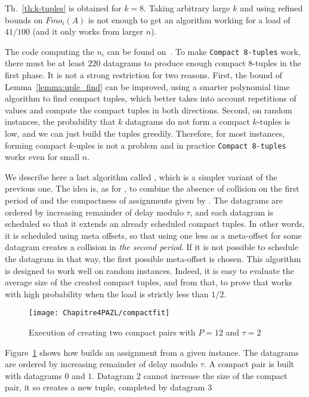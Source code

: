 Th.~\ref{th:k-tuples} is obtained for $k=8$. Taking arbitrary large $k$ and using refined bounds on $Fmo_i(A)$ is not enough to get an algorithm working for a load of $41/100$ (and it only works from larger $n$).

The code computing the $n_i$ can be found on~\cite{webpage}.
To make \texttt{Compact 8-tuples} work, there must be at least $220$ datagrams to
produce enough compact $8$-tuples in the first phase. It is not a strong restriction for two reasons. First, the bound of Lemma~\ref{lemma:uple_find} can be improved, using a smarter polynomial time algorithm to find compact tuples, which better takes into account repetitions of values and compute the compact tuples in both directions. Second, on random instances, the probability that $k$ datagrams do not form a compact $k$-tuples is low, and we can just build the tuples greedily. Therefore, for most instances, forming compact $k$-uples is not a problem and in practice \texttt{Compact 8-tuples} works even for small $n$.



We describe here a last algorithm called \compactfit, which is a simpler variant of the previous one. The idea is, as for \compactpair, to combine the absence of collision on the first period of \metaoffset and the compactness of assignments given by \firstfit.
The datagrams are ordered by increasing remainder of delay modulo $\tau$, and each datagram is scheduled so that 
it extends an already scheduled compact tuples. In other words, it is scheduled using meta offsets, so that using one less as a meta-offset for some datagram creates a collision in \emph{the second period}. If it is not possible to schedule the datagram in that way, the first possible meta-offset is chosen. This algorithm is designed to work well on random instances. Indeed, it 
is easy to evaluate the average size of the created compact tuples, and from that, to prove that \compactfit works with high probability when the load is strictly less than $1/2$.
\begin{figure}[h]
 \begin{center}
\texttt{[image: Chapitre4PAZL/compactfit]}
\end{center}
\caption{Execution of \compactfit creating two compact pairs with $P=12$ and $\tau =2$}
\label{fig:compactfit}
\end{figure}
Figure~\ref{fig:compactfit} shows how \compactfit builds an assignment from a given instance. The datagrams are ordered by increasing remainder of delay modulo $\tau$. A compact pair is built with datagrams $0$ and $1$. Datagram $2$ cannot increase the size of the compact pair, it so creates a new tuple, completed by datagram $3$



